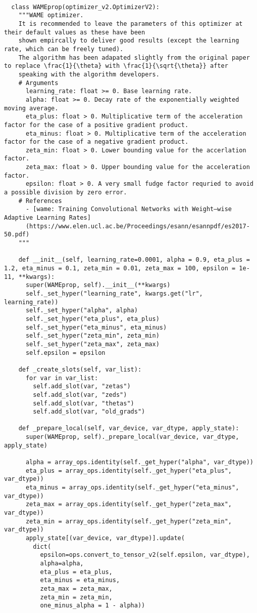\documentclass[12pt]{article}
\numberwithin{equation}{section}
\numberwithin{figure}{section}
\numberwithin{table}{section}
\begin{document}
\begin{lstlisting}
  
  class WAMEprop(optimizer_v2.OptimizerV2):
    """WAME optimizer.
    It is recommended to leave the parameters of this optimizer at their default values as these have been
    shown empircally to deliver good results (except the learning rate, which can be freely tuned).
    The algorithm has been adapated slightly from the original paper to replace \frac{1}{\theta} with \frac{1}{\sqrt{\theta}} after 
    speaking with the algorithm developers. 
    # Arguments
      learning_rate: float >= 0. Base learning rate.
      alpha: float >= 0. Decay rate of the exponentially weighted moving average.
      eta_plus: float > 0. Multiplicative term of the acceleration factor for the case of a positive gradient product.
      eta_minus: float > 0. Multiplicative term of the acceleration factor for the case of a negative gradient product.
      zeta_min: float > 0. Lower bounding value for the accerlation factor.
      zeta_max: float > 0. Upper bounding value for the acceleration factor.
      epsilon: float > 0. A very small fudge factor requried to avoid a possible division by zero error.
    # References
      - [wame: Training Convolutional Networks with Weight–wise Adaptive Learning Rates]
      (https://www.elen.ucl.ac.be/Proceedings/esann/esannpdf/es2017-50.pdf)
    """
  
    def __init__(self, learning_rate=0.0001, alpha = 0.9, eta_plus = 1.2, eta_minus = 0.1, zeta_min = 0.01, zeta_max = 100, epsilon = 1e-11, **kwargs):
      super(WAMEprop, self).__init__(**kwargs)
      self._set_hyper("learning_rate", kwargs.get("lr", learning_rate))
      self._set_hyper("alpha", alpha)
      self._set_hyper("eta_plus", eta_plus)
      self._set_hyper("eta_minus", eta_minus)
      self._set_hyper("zeta_min", zeta_min)
      self._set_hyper("zeta_max", zeta_max)
      self.epsilon = epsilon
   
    def _create_slots(self, var_list):
      for var in var_list:
        self.add_slot(var, "zetas")
        self.add_slot(var, "zeds")
        self.add_slot(var, "thetas")
        self.add_slot(var, "old_grads")
  
    def _prepare_local(self, var_device, var_dtype, apply_state):
      super(WAMEprop, self)._prepare_local(var_device, var_dtype, apply_state)
  
      alpha = array_ops.identity(self._get_hyper("alpha", var_dtype))
      eta_plus = array_ops.identity(self._get_hyper("eta_plus", var_dtype))
      eta_minus = array_ops.identity(self._get_hyper("eta_minus", var_dtype))
      zeta_max = array_ops.identity(self._get_hyper("zeta_max", var_dtype))
      zeta_min = array_ops.identity(self._get_hyper("zeta_min", var_dtype))
      apply_state[(var_device, var_dtype)].update(
        dict(
          epsilon=ops.convert_to_tensor_v2(self.epsilon, var_dtype),
          alpha=alpha,
          eta_plus = eta_plus,
          eta_minus = eta_minus,
          zeta_max = zeta_max,
          zeta_min = zeta_min,
          one_minus_alpha = 1 - alpha))
  

\end{lstlisting}
\end{document}

